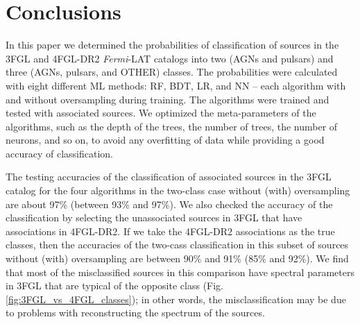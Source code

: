 \documentclass[referee]{aa} %
\newcommand{\lb}{\label}
\newcommand{\Fermi}{\textit{Fermi}\xspace}
\begin{document}
\begin{table}[!h]
\caption{Expected counts of sources among unassociated 4FGL-DR2 sources.}
\label{tab:expected_counts_prob_4FGL-DR2}

\centering
\end{table}


\section{Conclusions}
\lb{sec:conclusions}

In this paper we determined the probabilities of classification of sources in the 3FGL and 4FGL-DR2 \Fermi-LAT catalogs
into two (AGNs and pulsars) and three (AGNs, pulsars, and OTHER) classes.
The probabilities were calculated with eight different ML methods: RF, BDT, LR, and NN -- each algorithm with and without oversampling during training.
The algorithms were trained and tested with associated sources.
We optimized the meta-parameters of the algorithms, such as the depth of the trees, the number of trees, the number of neurons, and so on, to avoid any overfitting of data while providing a good accuracy of classification.

The testing accuracies of the classification of associated sources in the 3FGL catalog for the four algorithms in the two-class case without (with) oversampling are about  97\% (between 93\% and 97\%).
We also checked the accuracy of the classification by selecting the unassociated sources in 3FGL that have associations in 4FGL-DR2.
If we take the 4FGL-DR2 associations as the true classes, then the accuracies of the two-cass classification in this subset of sources 
without (with) oversampling are between 90\% and 91\% (85\% and 92\%).
We find that most of the misclassified sources in this comparison have spectral parameters in 3FGL that are typical of the opposite class 
(Fig. \ref{fig:3FGL_vs_4FGL_classes}); in other words, the misclassification may be due to problems with reconstructing the spectrum of the sources.
\end{document}
